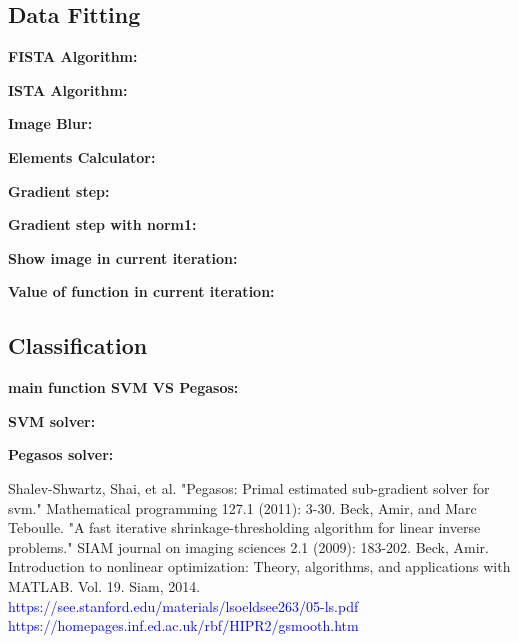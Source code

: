 \documentclass[12pt]{article}
\begin{document}
\subsection{Data Fitting}
\textbf{FISTA Algorithm:}

\textbf{ISTA Algorithm:}

\textbf{Image Blur:}

\textbf{Elements Calculator:}

\textbf{Gradient step:}

\textbf{Gradient step with norm1:}

\textbf{Show image in current iteration:}

\textbf{Value of function in current iteration:}

\subsection{Classification}
\textbf{main function SVM VS Pegasos:}

\textbf{SVM solver:}

\textbf{Pegasos solver:}

\newpage
\begin{thebibliography}{99}

 Shalev-Shwartz, Shai, et al. "Pegasos: Primal estimated sub-gradient solver for svm." Mathematical programming 127.1 (2011): 3-30.
 Beck, Amir, and Marc Teboulle. "A fast iterative shrinkage-thresholding algorithm for linear inverse problems." SIAM journal on imaging sciences 2.1 (2009): 183-202.
 Beck, Amir. Introduction to nonlinear optimization: Theory, algorithms, and applications with MATLAB. Vol. 19. Siam, 2014.
 \textcolor{blue}{https://see.stanford.edu/materials/lsoeldsee263/05-ls.pdf}
 \textcolor{blue}{https://homepages.inf.ed.ac.uk/rbf/HIPR2/gsmooth.htm}

\end{thebibliography}
\end{document}
